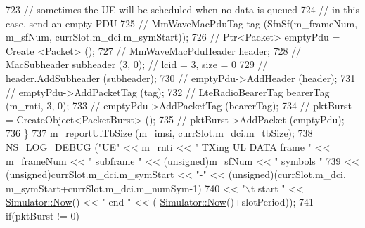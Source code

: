 \begin{DoxyCode}
723                         \textcolor{comment}{// sometimes the UE will be scheduled when no data is queued}
724                         \textcolor{comment}{// in this case, send an empty PDU}
725                         \textcolor{comment}{// MmWaveMacPduTag tag (SfnSf(m\_frameNum, m\_sfNum, currSlot.m\_dci.m\_symStart));}
726                         \textcolor{comment}{// Ptr<Packet> emptyPdu = Create <Packet> ();}
727                         \textcolor{comment}{// MmWaveMacPduHeader header;}
728                         \textcolor{comment}{// MacSubheader subheader (3, 0);  // lcid = 3, size = 0}
729                         \textcolor{comment}{// header.AddSubheader (subheader);}
730                         \textcolor{comment}{// emptyPdu->AddHeader (header);}
731                         \textcolor{comment}{// emptyPdu->AddPacketTag (tag);}
732                         \textcolor{comment}{// LteRadioBearerTag bearerTag (m\_rnti, 3, 0);}
733                         \textcolor{comment}{// emptyPdu->AddPacketTag (bearerTag);}
734                         \textcolor{comment}{// pktBurst = CreateObject<PacketBurst> ();}
735                         \textcolor{comment}{// pktBurst->AddPacket (emptyPdu);}
736                 \}
737                 \hyperlink{classns3_1_1MmWaveUePhy_af182f14fb53bb3fea59e51d420fe0489}{m\_reportUlTbSize} (\hyperlink{classns3_1_1MmWaveUePhy_ae1bada3d54462b51bc01803e56f449ee}{m\_imsi}, currSlot.m\_dci.m\_tbSize);
738                 \hyperlink{group__logging_ga413f1886406d49f59a6a0a89b77b4d0a}{NS\_LOG\_DEBUG} (\textcolor{stringliteral}{"UE"} << \hyperlink{classns3_1_1MmWaveUePhy_aae63c66b69de47ac19b4033ecf4bc211}{m\_rnti} << \textcolor{stringliteral}{" TXing UL DATA frame "} << 
      \hyperlink{classns3_1_1MmWavePhy_a852ce585035a1c12122d2775e64ff38a}{m\_frameNum} << \textcolor{stringliteral}{" subframe "} << (\textcolor{keywordtype}{unsigned})\hyperlink{classns3_1_1MmWavePhy_af3d76eb9f3e5e1ff669852d05986c1a3}{m\_sfNum} << \textcolor{stringliteral}{" symbols "}
739                               << (\textcolor{keywordtype}{unsigned})currSlot.m\_dci.m\_symStart << \textcolor{stringliteral}{"-"} << (\textcolor{keywordtype}{unsigned})(currSlot.m\_dci.
      m\_symStart+currSlot.m\_dci.m\_numSym-1)
740                               << \textcolor{stringliteral}{"\(\backslash\)t start "} << \hyperlink{classns3_1_1Simulator_ac3178fa975b419f7875e7105be122800}{Simulator::Now}() << \textcolor{stringliteral}{" end "} << (
      \hyperlink{classns3_1_1Simulator_ac3178fa975b419f7875e7105be122800}{Simulator::Now}()+slotPeriod));
741                 \textcolor{keywordflow}{if}(pktBurst != 0)

\end{DoxyCode}
